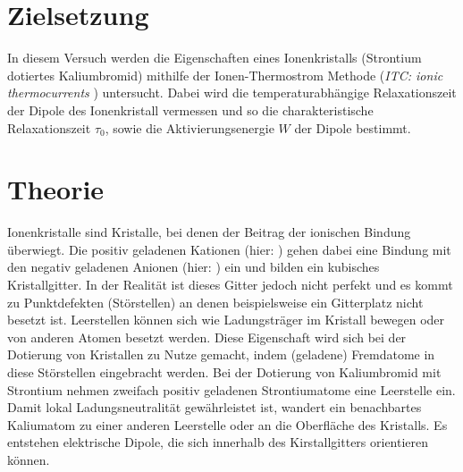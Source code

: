 \section{Zielsetzung}
In diesem Versuch werden die Eigenschaften eines Ionenkristalls (Strontium dotiertes Kaliumbromid) mithilfe der Ionen-Thermostrom Methode
(\textit{ITC: ionic thermocurrents} \cite{PhysRev.148.816}) untersucht.
Dabei wird die temperaturabhängige Relaxationszeit der Dipole des Ionenkristall vermessen und so die charakteristische Relaxationszeit $\tau_0$, sowie die Aktivierungsenergie $W$
der Dipole bestimmt.

\section{Theorie}
\label{sec:Theorie}
Ionenkristalle sind Kristalle, bei denen der Beitrag der ionischen Bindung überwiegt. Die positiv geladenen Kationen (hier: ) gehen dabei eine Bindung mit den negativ
geladenen Anionen (hier: ) ein und bilden ein kubisches Kristallgitter. In der Realität ist dieses Gitter jedoch nicht perfekt und es kommt zu Punktdefekten (Störstellen)
an denen beispielsweise ein Gitterplatz nicht besetzt ist. Leerstellen können sich wie Ladungsträger im Kristall bewegen oder von anderen Atomen besetzt werden.
Diese Eigenschaft wird sich bei der Dotierung von Kristallen zu Nutze gemacht, indem (geladene) Fremdatome in diese Störstellen eingebracht werden. 
Bei der Dotierung von Kaliumbromid mit Strontium nehmen zweifach positiv geladenen Strontiumatome eine Leerstelle ein. Damit lokal Ladungsneutralität gewährleistet ist,
wandert ein benachbartes Kaliumatom zu einer anderen Leerstelle oder an die Oberfläche des Kristalls.
Es entstehen elektrische Dipole, die sich innerhalb des Kirstallgitters orientieren können.


